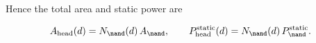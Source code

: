 Hence the total area and static power are






\[






A_{\text{head}}(d) = N_{\nand}(d)\,A_{\nand},






\qquad






P_{\text{head}}^{\text{static}}(d) = N_{\nand}(d)\,P_{\nand}^{\text{static}} .






\]














